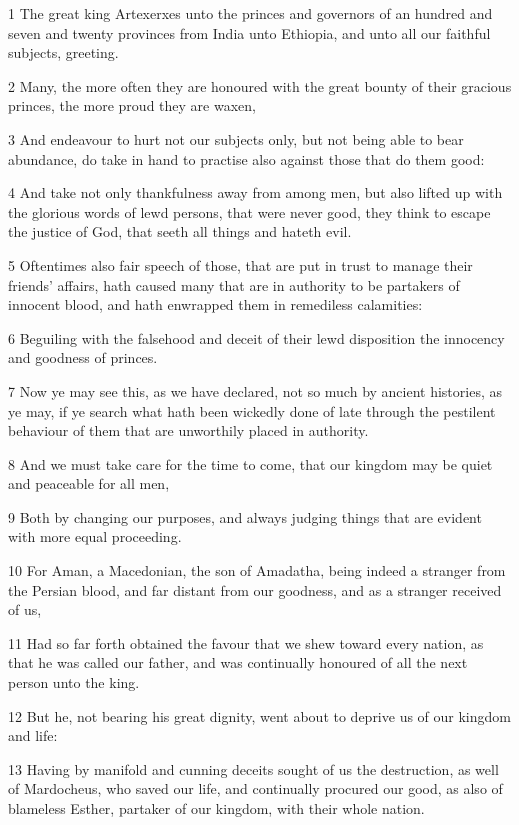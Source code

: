 \par 1 The great king Artexerxes unto the princes and governors of an hundred and seven and twenty provinces from India unto Ethiopia, and unto all our faithful subjects, greeting.
\par 2 Many, the more often they are honoured with the great bounty of their gracious princes, the more proud they are waxen,
\par 3 And endeavour to hurt not our subjects only, but not being able to bear abundance, do take in hand to practise also against those that do them good:
\par 4 And take not only thankfulness away from among men, but also lifted up with the glorious words of lewd persons, that were never good, they think to escape the justice of God, that seeth all things and hateth evil.
\par 5 Oftentimes also fair speech of those, that are put in trust to manage their friends' affairs, hath caused many that are in authority to be partakers of innocent blood, and hath enwrapped them in remediless calamities:
\par 6 Beguiling with the falsehood and deceit of their lewd disposition the innocency and goodness of princes.
\par 7 Now ye may see this, as we have declared, not so much by ancient histories, as ye may, if ye search what hath been wickedly done of late through the pestilent behaviour of them that are unworthily placed in authority.
\par 8 And we must take care for the time to come, that our kingdom may be quiet and peaceable for all men,
\par 9 Both by changing our purposes, and always judging things that are evident with more equal proceeding.
\par 10 For Aman, a Macedonian, the son of Amadatha, being indeed a stranger from the Persian blood, and far distant from our goodness, and as a stranger received of us,
\par 11 Had so far forth obtained the favour that we shew toward every nation, as that he was called our father, and was continually honoured of all the next person unto the king.
\par 12 But he, not bearing his great dignity, went about to deprive us of our kingdom and life:
\par 13 Having by manifold and cunning deceits sought of us the destruction, as well of Mardocheus, who saved our life, and continually procured our good, as also of blameless Esther, partaker of our kingdom, with their whole nation.
